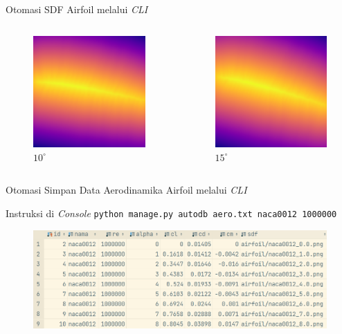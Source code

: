\begin{frame}{Otomasi SDF Airfoil melalui \textit{CLI}}
\begin{columns}[t]
    \begin{column}{.25\linewidth}
      \begin{figure}[h]
        \centering
        \includegraphics[width=0.5\linewidth]{statics/naca0012_10.0}
        \caption{$10^\circ$}
      \end{figure}
    \end{column}

    \begin{column}{.25\linewidth}
      \begin{figure}[h]
        \centering
        \includegraphics[width=0.5\linewidth]{statics/naca0012_15.0}
        \caption{$15^\circ$}
      \end{figure}
    \end{column}
  \end{columns}
\end{frame}

\begin{frame}{Otomasi Simpan Data Aerodinamika Airfoil melalui \textit{CLI}}
  \begin{block}{Instruksi di \textit{Console}}
    \texttt{python manage.py autodb aero.txt naca0012 1000000}
  \end{block}

  \begin{figure}[h]
    \centering
    \includegraphics[width=0.7\linewidth]{statics/autoinsert}
  \end{figure}

\end{frame}